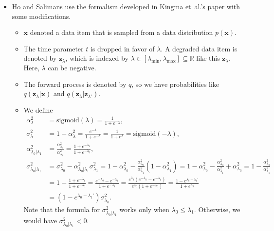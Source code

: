\documentclass[10pt]{article}
\newcommand{\ve}[1]{\mathbf{#1}}
\newcommand{\etal}{{et~al.}}
\newcommand{\Real}{\mathbb{R}}
\newcommand{\sigmoid}{\mathrm{sigmoid}}
\begin{document}
\begin{itemize}
  \item Ho and Salimans use the formalism developed in Kingma \etal's paper \cite{Kingma:2021} with some modifications.  

  \begin{itemize}
    \item $\ve{x}$ denoted a data item that is sampled from a data distribution $p(\ve{x})$.
    
    \item The time parameter $t$ is dropped in favor of $\lambda$. A degraded data item is denoted by $\ve{z}_\lambda$, which is indexed by $\lambda \in [\lambda_{\min}, \lambda_{\max}] \subseteq \Real$ like this $\ve{z}_\lambda$. Here, $\lambda$ can be negative.
    
    \item The forward process is denoted by $q$, so we have probabilities like $q(\ve{z}_\lambda | \ve{x})$ and $q(\ve{z}_{\lambda} | \ve{z}_{\lambda'})$.

    \item We define
    \begin{align*}
      \alpha_{\lambda}^2 
      &= \sigmoid(\lambda) = \frac{1}{1 + e^{-\lambda}}, 
      \\
      \sigma_\lambda^2       
      &= 1 - \alpha^2_\lambda = \frac{e^{-\lambda}}{1 + e^{-\lambda}} = \frac{1}{1 + e^{\lambda}} = \sigmoid(-\lambda), 
      \\
      \alpha^2_{\lambda_0|\lambda_1} 
      &= \frac{\alpha^2_{\lambda_0}}{\alpha^2_{\lambda_1}} = \frac{1 + e^{-\lambda_1}}{1 + e^{-\lambda_0}}, 
      \\
      \sigma^2_{\lambda_0|\lambda_1}
      &= \sigma^2_{\lambda_0} - \alpha^2_{\lambda_0|\lambda_1} \sigma^2_{\lambda_1} 
      = 1 - \alpha^2_{\lambda_0} - \frac{\alpha_{\lambda_0}^2}{\alpha_{\lambda_1}^2} (1 - \alpha^2_{\lambda_1}) 
      = 1 - \alpha_{\lambda_0}^2 - \frac{\alpha_{\lambda_0}^2}{\alpha_{\lambda_1}^2} + \alpha_{\lambda_0}^2
      = 1 - \frac{\alpha_{\lambda_0}^2}{\alpha_{\lambda_1}^2} 
      \\
      &= 1 - \frac{1 + e^{-\lambda_1}}{1 + e^{-\lambda_0}} 
      = \frac{e^{-\lambda_0} - e^{-\lambda_1}}{1 + e^{-\lambda_0}}
      = \frac{e^{\lambda_0}(e^{-\lambda_0} - e^{-\lambda_1})}{e^{\lambda_0}(1 + e^{-\lambda_0})}
      = \frac{1 - e^{\lambda_0-\lambda_1'}}{1 + e^{\lambda_0}} 
      \\
      &= (1 - e^{\lambda_0-\lambda_1'}) \sigma_{\lambda_0}^2.
    \end{align*}
    Note that the formula for $\sigma_{\lambda_0|\lambda_1}^2$ works only when $\lambda_0 \leq \lambda_1$. Otherwise, we would have $\sigma^2_{\lambda_0|\lambda_1} < 0$.


\end{itemize}
\end{itemize}
\end{document}
